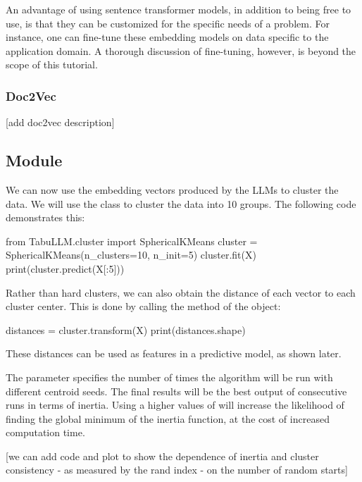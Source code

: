 \documentclass[article]{jss}
\begin{document}
An advantage of using sentence transformer models, in addition to being free to use, is that they can be customized for the specific needs of a problem. For instance, one can fine-tune these embedding models on data specific to the application domain. A thorough discussion of fine-tuning, however, is beyond the scope of this tutorial.

\subsubsection{Doc2Vec}\label{subsubsec:using-embed-doc2vec}

[add doc2vec description]

\subsection[cluster Module]{ Module}\label{subsec:using-cluster}

We can now use the embedding vectors produced by the LLMs to cluster the data. We will use the  class to cluster the data into 10 groups. The following code demonstrates this:
\begin{pyblock}
from TabuLLM.cluster import SphericalKMeans
cluster = SphericalKMeans(n_clusters=10, n_init=5)
cluster.fit(X)
print(cluster.predict(X[:5]))
\end{pyblock}
\stdoutpythontex %

Rather than hard clusters, we can also obtain the distance of each vector to each cluster center. This is done by calling the  method of the  object:
\begin{pyblock}
distances = cluster.transform(X)
print(distances.shape)
\end{pyblock}
\stdoutpythontex %

These distances can be used as features in a predictive model, as shown later.

The parameter  specifies the number of times the algorithm will be run with different centroid seeds. The final results will be the best output of  consecutive runs in terms of inertia. Using a higher values of  will increase the likelihood of finding the global minimum of the inertia function, at the cost of increased computation time.

[we can add code and plot to show the dependence of inertia and cluster consistency - as measured by the rand index - on the number of random starts]
\end{document}

